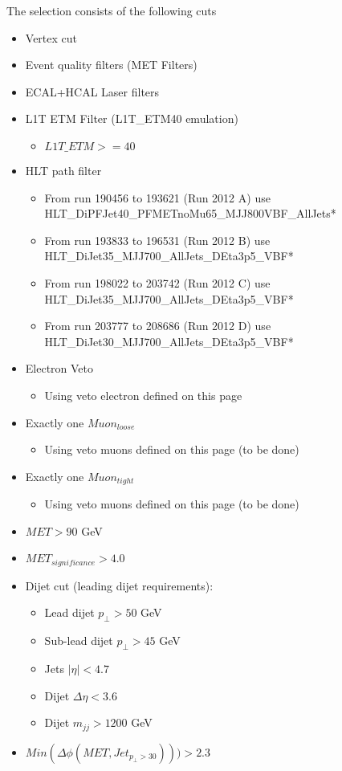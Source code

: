 The selection consists of the following cuts
\begin{itemize}
  \item Vertex cut 
  \item Event quality filters (MET Filters)
  \item ECAL+HCAL Laser filters
  \item L1T ETM Filter (L1T\_ETM40 emulation)
  \begin{itemize}
    \item $ L1T\_ETM >= 40 $
  \end{itemize}
  \item HLT path filter
  \begin{itemize}
    \item From run 190456 to 193621 (Run 2012 A) use HLT\_DiPFJet40\_PFMETnoMu65\_MJJ800VBF\_AllJets* 
    \item From run 193833 to 196531 (Run 2012 B) use HLT\_DiJet35\_MJJ700\_AllJets\_DEta3p5\_VBF*
    \item From run 198022 to 203742 (Run 2012 C) use HLT\_DiJet35\_MJJ700\_AllJets\_DEta3p5\_VBF*
    \item From run 203777 to 208686 (Run 2012 D) use HLT\_DiJet30\_MJJ700\_AllJets\_DEta3p5\_VBF*
  \end{itemize}
  \item Electron Veto
  \begin{itemize}
    \item Using veto electron defined on this page
  \end{itemize}
  \item Exactly one $Muon_{loose}$
  \begin{itemize}
    \item Using veto muons defined on this page (to be done)
  \end{itemize}
  \item Exactly one $Muon_{tight}$
  \begin{itemize}
    \item Using veto muons defined on this page (to be done)
  \end{itemize}
  \item $MET > 90 $ GeV
  \item $MET_{significance} > 4.0 $
  \item Dijet cut (leading dijet requirements):
  \begin{itemize}
    \item Lead dijet $ p_{\perp} > 50$ GeV
    \item Sub-lead dijet $ p_{\perp} > 45$ GeV
    \item Jets $ |\eta| < 4.7 $
    \item Dijet $ \Delta\eta < 3.6 $
    \item Dijet $ m_{jj} > 1200 $ GeV
  \end{itemize}
  \item $ Min(\Delta\phi(MET,Jet_{p_{\perp}>30})))>2.3 $
\end{itemize}

